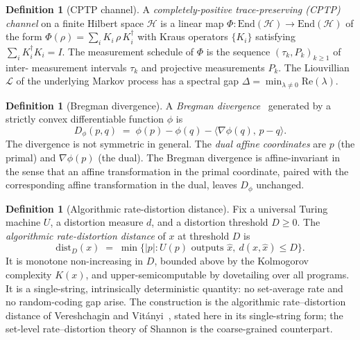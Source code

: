 \documentclass[11pt,a4paper]{article}
\theoremstyle{plain}
\theoremstyle{definition}
\newtheorem{definition}[theorem]{Definition}
\theoremstyle{remark}
\newcommand{\HH}{\mathcal{H}}
\newcommand{\End}{\mathrm{End}}
\newcommand{\distD}{\mathrm{dist}_{D}}
\begin{document}
\begin{definition}[CPTP channel]
\label{def:cptp}
A \emph{completely-positive trace-preserving (CPTP) channel} on a finite
Hilbert space $\HH$ is a linear map $\Phi:\End(\HH)\to\End(\HH)$ of the
form $\Phi(\rho)=\sum_i K_i\,\rho\,K_i^\dagger$ with Kraus operators
$\{K_i\}$ satisfying $\sum_i K_i^\dagger K_i = I$. The measurement
schedule of $\Phi$ is the sequence $(\tau_k, P_k)_{k\geq 1}$ of inter-
measurement intervals $\tau_k$ and projective measurements $P_k$. The
Liouvillian $\mathcal{L}$ of the underlying Markov process has a spectral
gap $\Delta = \min_{\lambda\neq 0}\mathrm{Re}(\lambda)$.
\end{definition}

\begin{definition}[Bregman divergence]
\label{def:bregman}
A \emph{Bregman divergence}~\cite{bregman1967,amari2000} generated by
a strictly convex differentiable function $\phi$ is
\begin{equation}
  D_\phi(p,q) \;=\; \phi(p) - \phi(q) - \langle\nabla\phi(q),\, p-q\rangle.
\end{equation}
The divergence is not symmetric in general. The \emph{dual affine
coordinates} are $p$ (the primal) and $\nabla\phi(p)$ (the dual). The
Bregman divergence is affine-invariant in the sense that an affine
transformation in the primal coordinate, paired with the corresponding
affine transformation in the dual, leaves $D_\phi$ unchanged.
\end{definition}

\begin{definition}[Algorithmic rate-distortion distance]
\label{def:ard}
Fix a universal Turing machine $U$, a distortion measure $d$, and a
distortion threshold $D\geq 0$. The \emph{algorithmic rate-distortion
distance} of $x$ at threshold $D$ is
\begin{equation}\label{eq:distD-def}
  \distD(x) \;=\; \min\bigl\{|p| : U(p)\text{ outputs }\hat x,\
  d(x,\hat x)\leq D\bigr\}.
\end{equation}
It is monotone non-increasing in $D$, bounded above by the Kolmogorov
complexity $K(x)$, and upper-semicomputable by dovetailing over all
programs. It is a single-string, intrinsically deterministic
quantity: no set-average rate and no random-coding gap arise. The
construction is the algorithmic rate--distortion distance of
Vereshchagin and Vit\'anyi~\citep{vereshchagin2010rate}, stated
here in its single-string form; the set-level rate--distortion
theory of Shannon is the coarse-grained
counterpart.
\end{definition}
\end{document}

